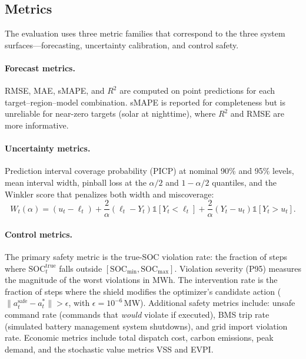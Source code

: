 \documentclass[11pt,a4paper]{article}
\begin{document}
\subsection{Metrics}

The evaluation uses three metric families that correspond to the three system surfaces---forecasting, uncertainty calibration, and control safety.

\paragraph{Forecast metrics.} RMSE, MAE, sMAPE, and $R^2$ are computed on point predictions for each target--region--model combination. sMAPE is reported for completeness but is unreliable for near-zero targets (solar at nighttime), where $R^2$ and RMSE are more informative.

\paragraph{Uncertainty metrics.} Prediction interval coverage probability (PICP) at nominal 90\% and 95\% levels, mean interval width, pinball loss at the $\alpha/2$ and $1-\alpha/2$ quantiles, and the Winkler score that penalizes both width and miscoverage:
\begin{equation}\label{eq:winkler}
  W_t(\alpha) = (u_t - \ell_t) + \frac{2}{\alpha}(\ell_t - Y_t)\mathbb{1}[Y_t < \ell_t] + \frac{2}{\alpha}(Y_t - u_t)\mathbb{1}[Y_t > u_t].
\end{equation}

\paragraph{Control metrics.} The primary safety metric is the true-SOC violation rate: the fraction of steps where $\mathrm{SOC}^{\mathrm{true}}_t$ falls outside $[\mathrm{SOC}_{\min}, \mathrm{SOC}_{\max}]$. Violation severity (P95) measures the magnitude of the worst violations in MWh. The intervention rate is the fraction of steps where the shield modifies the optimizer's candidate action ($\|a_t^{\mathrm{safe}} - a_t^*\| > \epsilon$, with $\epsilon = 10^{-6}$\,MW). Additional safety metrics include: unsafe command rate (commands that \emph{would} violate if executed), BMS trip rate (simulated battery management system shutdowns), and grid import violation rate. Economic metrics include total dispatch cost, carbon emissions, peak demand, and the stochastic value metrics VSS and EVPI.
\end{document}
